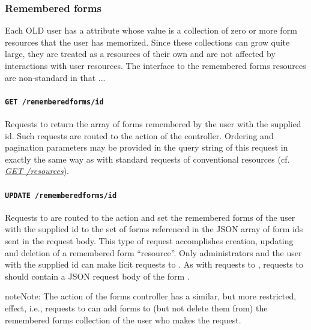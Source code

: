 \documentclass[letterpaper,10pt,english]{sphinxmanual}
\begin{document}
\subsubsection{Remembered forms}
\label{interface:remembered-forms-interface}\label{interface:remembered-forms}
Each OLD user has a  attribute whose value is a collection of
zero or more form resources that the user has memorized.  Since these
collections can grow quite large, they are treated as a resources of their own
and are not affected by interactions with user resources.  The interface to the
remembered forms resources are non-standard in that ...


\paragraph{\texttt{GET /rememberedforms/id}}
\label{interface:get-rememberedforms-id}
Requests to  return the array of forms remembered by
the user with the supplied id.  Such requests are routed to the  action
of the  controller.  Ordering and pagination parameters may
be provided in the query string of this request in exactly the same way as with
standard  requests of conventional resources (cf.
{\hyperref[interface:get-resources]{\emph{GET /resources}}}).


\paragraph{\texttt{UPDATE /rememberedforms/id}}
\label{interface:update-rememberedforms-id}
Requests to  are routed to the  action
and set the remembered forms of the user with the supplied id to the set of
forms referenced in the JSON array of form ids sent in the request body. This
type of request accomplishes creation, updating and deletion of a
remembered form ``resource''.  Only administrators and the user with the supplied
id can make licit requests to .  As with requests
to , requests to  should
contain a JSON request body of the form .

\begin{notice}{note}{Note:}
The  action of the forms controller has a similar, but more
restricted, effect, i.e., requests to  can add forms
to (but not delete them from) the remembered forms collection of the user who
makes the request.
\end{notice}
\end{document}
